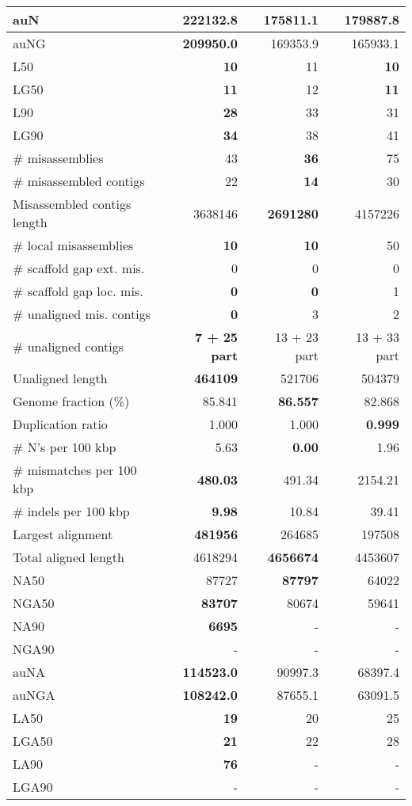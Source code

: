 \documentclass[12pt,a4paper]{article}
\begin{document}
\begin{table}[ht]
\begin{center}
\begin{tabular}{|l*{3}{|r}|}
auN & {\bf 222132.8} & 175811.1 & 179887.8 \\ \hline
auNG & {\bf 209950.0} & 169353.9 & 165933.1 \\ \hline
L50 & {\bf 10} & 11 & {\bf 10} \\ \hline
LG50 & {\bf 11} & 12 & {\bf 11} \\ \hline
L90 & {\bf 28} & 33 & 31 \\ \hline
LG90 & {\bf 34} & 38 & 41 \\ \hline
\# misassemblies & 43 & {\bf 36} & 75 \\ \hline
\# misassembled contigs & 22 & {\bf 14} & 30 \\ \hline
Misassembled contigs length & 3638146 & {\bf 2691280} & 4157226 \\ \hline
\# local misassemblies & {\bf 10} & {\bf 10} & 50 \\ \hline
\# scaffold gap ext. mis. & 0 & 0 & 0 \\ \hline
\# scaffold gap loc. mis. & {\bf 0} & {\bf 0} & 1 \\ \hline
\# unaligned mis. contigs & {\bf 0} & 3 & 2 \\ \hline
\# unaligned contigs & {\bf 7 + 25 part} & 13 + 23 part & 13 + 33 part \\ \hline
Unaligned length & {\bf 464109} & 521706 & 504379 \\ \hline
Genome fraction (\%) & 85.841 & {\bf 86.557} & 82.868 \\ \hline
Duplication ratio & 1.000 & 1.000 & {\bf 0.999} \\ \hline
\# N's per 100 kbp & 5.63 & {\bf 0.00} & 1.96 \\ \hline
\# mismatches per 100 kbp & {\bf 480.03} & 491.34 & 2154.21 \\ \hline
\# indels per 100 kbp & {\bf 9.98} & 10.84 & 39.41 \\ \hline
Largest alignment & {\bf 481956} & 264685 & 197508 \\ \hline
Total aligned length & 4618294 & {\bf 4656674} & 4453607 \\ \hline
NA50 & 87727 & {\bf 87797} & 64022 \\ \hline
NGA50 & {\bf 83707} & 80674 & 59641 \\ \hline
NA90 & {\bf 6695} & - & - \\ \hline
NGA90 & - & - & - \\ \hline
auNA & {\bf 114523.0} & 90997.3 & 68397.4 \\ \hline
auNGA & {\bf 108242.0} & 87655.1 & 63091.5 \\ \hline
LA50 & {\bf 19} & 20 & 25 \\ \hline
LGA50 & {\bf 21} & 22 & 28 \\ \hline
LA90 & {\bf 76} & - & - \\ \hline
LGA90 & - & - & - \\ \hline
\end{tabular}
\end{center}
\end{table}
\end{document}
